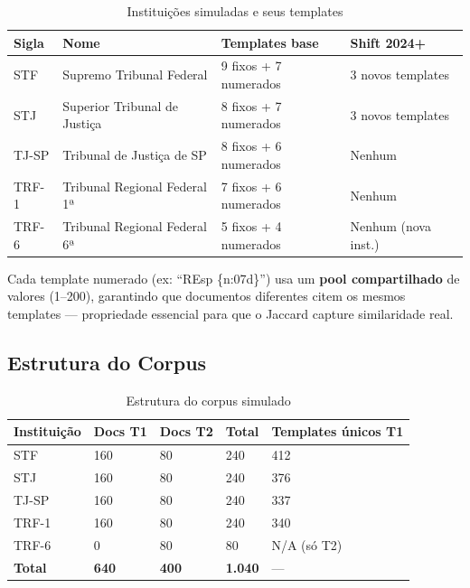 \documentclass[12pt,a4paper]{article}
\theoremstyle{remark}
\begin{document}
\begin{table}[H]\centering\footnotesize
\caption{Instituições simuladas e seus templates}
\label{tab:instituicoes}
\begin{tabular}{p{}p{}p{}p{}}
\toprule
\textbf{Sigla} & \textbf{Nome} & \textbf{Templates base} & \textbf{Shift 2024+} \\
\midrule
STF & Supremo Tribunal Federal & 9 fixos + 7 numerados & 3 novos templates \\
STJ & Superior Tribunal de Justiça & 8 fixos + 7 numerados & 3 novos templates \\
TJ-SP & Tribunal de Justiça de SP & 8 fixos + 6 numerados & Nenhum \\
TRF-1 & Tribunal Regional Federal 1ª & 7 fixos + 6 numerados & Nenhum \\
TRF-6 & Tribunal Regional Federal 6ª & 5 fixos + 4 numerados & Nenhum (nova inst.) \\
\bottomrule
\end{tabular}
\end{table}

Cada template numerado (ex: ``REsp \{n:07d\}'') usa um \textbf{pool compartilhado} de valores (1--200), garantindo que documentos diferentes citem os mesmos templates — propriedade essencial para que o Jaccard capture similaridade real.

\subsection{Estrutura do Corpus}

\begin{table}[H]\centering\footnotesize
\caption{Estrutura do corpus simulado}
\label{tab:corpus}
\begin{tabular}{p{}p{}p{}p{}p{}}
\toprule
\textbf{Instituição} & \textbf{Docs T1} & \textbf{Docs T2} & \textbf{Total} & \textbf{Templates únicos T1} \\
\midrule
STF & 160 & 80 & 240 & 412 \\
STJ & 160 & 80 & 240 & 376 \\
TJ-SP & 160 & 80 & 240 & 337 \\
TRF-1 & 160 & 80 & 240 & 340 \\
TRF-6 & 0 & 80 & 80 & N/A (só T2) \\
\midrule
\textbf{Total} & \textbf{640} & \textbf{400} & \textbf{1.040} & — \\
\bottomrule
\end{tabular}
\end{table}
\end{document}
